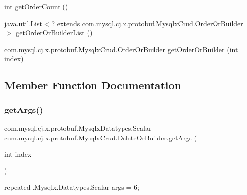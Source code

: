 \begin{DoxyCompactItemize}
\item 
int \mbox{\hyperlink{interfacecom_1_1mysql_1_1cj_1_1x_1_1protobuf_1_1_mysqlx_crud_1_1_delete_or_builder_a62e3ecbb40803261ab51a17f22a40159}{get\+Order\+Count}} ()
\item 
java.\+util.\+List$<$? extends \mbox{\hyperlink{interfacecom_1_1mysql_1_1cj_1_1x_1_1protobuf_1_1_mysqlx_crud_1_1_order_or_builder}{com.\+mysql.\+cj.\+x.\+protobuf.\+Mysqlx\+Crud.\+Order\+Or\+Builder}} $>$ \mbox{\hyperlink{interfacecom_1_1mysql_1_1cj_1_1x_1_1protobuf_1_1_mysqlx_crud_1_1_delete_or_builder_a1a6fd5ee20aac26e5ee8acfbb08ab857}{get\+Order\+Or\+Builder\+List}} ()
\item 
\mbox{\hyperlink{interfacecom_1_1mysql_1_1cj_1_1x_1_1protobuf_1_1_mysqlx_crud_1_1_order_or_builder}{com.\+mysql.\+cj.\+x.\+protobuf.\+Mysqlx\+Crud.\+Order\+Or\+Builder}} \mbox{\hyperlink{interfacecom_1_1mysql_1_1cj_1_1x_1_1protobuf_1_1_mysqlx_crud_1_1_delete_or_builder_a5dfcc5201cba28a260a633552d0e3040}{get\+Order\+Or\+Builder}} (int index)
\end{DoxyCompactItemize}


\subsection{Member Function Documentation}
\mbox{\label{interfacecom_1_1mysql_1_1cj_1_1x_1_1protobuf_1_1_mysqlx_crud_1_1_delete_or_builder_af94a9cf2b608beb4d44cd9bc0a5bea65}} 
\subsubsection{\texorpdfstring{get\+Args()}{getArgs()}}
{\footnotesize\ttfamily com.\+mysql.\+cj.\+x.\+protobuf.\+Mysqlx\+Datatypes.\+Scalar com.\+mysql.\+cj.\+x.\+protobuf.\+Mysqlx\+Crud.\+Delete\+Or\+Builder.\+get\+Args (\begin{DoxyParamCaption}\item[{int}]{index }\end{DoxyParamCaption})}

{\ttfamily repeated .Mysqlx.\+Datatypes.\+Scalar args = 6;} \mbox{\label{interfacecom_1_1mysql_1_1cj_1_1x_1_1protobuf_1_1_mysqlx_crud_1_1_delete_or_builder_ad236bae0dbe9ac9fb63f0c56da7d21dc}} 
